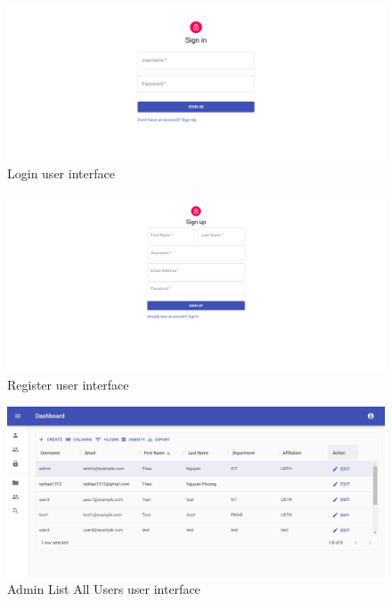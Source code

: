 \begin{figure}[H]
    \centering
    \includegraphics[width=1.0\textwidth]{images/SignIn.png}
    \caption{Login user interface}
    \label{fig:login}
\end{figure}
\begin{figure}[H]
    \centering
    \includegraphics[width=1.0\textwidth]{images/Register.png}
    \caption{Register user interface}
    \label{fig:register}
\end{figure}
\begin{figure}[H]
    \centering
    \includegraphics[width=1.0\textwidth]{images/Admin-All-Users.jpg}
    \caption{Admin List All Users user interface}
    \label{fig:adminAllUsers}
\end{figure}
